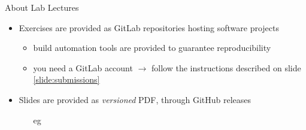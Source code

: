 \documentclass[presentation]{beamer}\mode<presentation>{\usetheme{AMSBolognaFC}}
\begin{document}
\begin{frame}[c,allowframebreaks]{About Lab Lectures}
\begin{itemize}
        \item Exercises are provided as GitLab repositories hosting software projects
        \begin{itemize}
			\item build automation tools are provided to guarantee reproducibility
            \item you need a GitLab account $\rightarrow$ follow the instructions described on slide \ref{slide:submissions}
        \end{itemize}

        \bigskip

        \item Slides are provided as \emph{versioned} PDF, through GitHub releases
        \begin{itemize}
            \item[eg] 
        \end{itemize}

    \end{itemize}

\end{frame}
\end{document}
